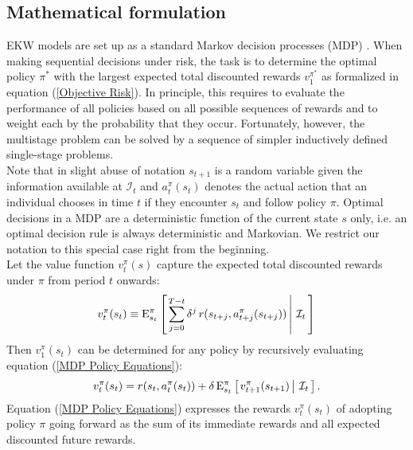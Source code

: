 \subsection{Mathematical formulation}\label{Mathematics}
EKW models are set up as a standard Markov decision processes (MDP) \citep{Puterman.1994,White.1993}. When making sequential decisions under risk, the task is to determine the optimal policy $\pi^*$ with the largest expected total discounted rewards $v^{\pi^*}_1$ as formalized in equation (\ref{Objective Risk}). In principle, this requires to evaluate the performance of all policies based on all possible sequences of rewards and to weight each by the probability that they occur. Fortunately, however, the multistage problem can be solved by a sequence of simpler inductively defined single-stage problems.\\

\noindent Note that in slight abuse of notation $s_{t + 1}$ is a random variable given the information available at $\mathcal{I}_t$ and $a^\pi_{t}(s_{t})$ denotes the actual action that an individual chooses in time $t$ if they encounter $s_{t}$ and follow policy $\pi$. Optimal decisions in a MDP are a deterministic function of the current state $s$ only, i.e. an optimal decision rule is always deterministic and Markovian. We
restrict our notation to this special case right from the beginning.\\

\noindent Let the value function $v^\pi_t(s)$ capture the expected total discounted rewards under $\pi$ from period $t$ onwards:
%
\begin{align*}
  v^\pi_t(s_t) \equiv \mathrm{E}_{s_t}^\pi\left[\left.\sum^{T - t}_{j = 0}  \delta^j\, r(s_{t + j}, a^\pi_{t + j}(s_{t + j})) \,\right\vert\,\mathcal{I}_t\,\right]
\end{align*}
%
Then $v_1^\pi(s_t)$ can be determined for any policy by recursively evaluating equation (\ref{MDP Policy Equations}):
%
\begin{align}\label{MDP Policy Equations}
v^\pi_t(s_t) = r(s_t,  a^\pi_t(s_t)) + \delta\,\mathrm{E}^\pi_{s_t} \left[\left.v^\pi_{t + 1}(s_{t + 1})  \,\right\vert\,\mathcal{I}_t\,\right].
\end{align}
%
Equation (\ref{MDP Policy Equations}) expresses the rewards $v^\pi_t(s_t)$ of adopting policy $\pi$ going forward as the sum of its immediate rewards and all expected discounted future rewards.\\

